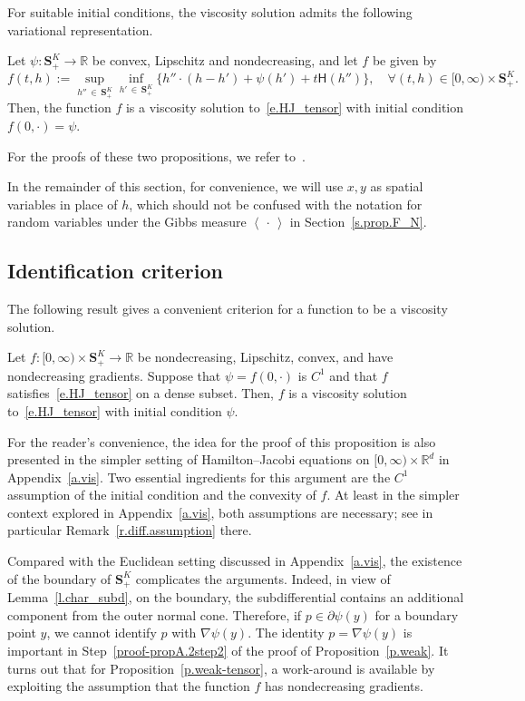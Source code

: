\documentclass[10pt]{amsart}
\theoremstyle{definition}\newtheorem{defi}[theo]{Definition}\newtheorem{rema}[theo]{Remark}\newtheorem{exam}[theo]{Example}\newtheorem{exem}[theo]{Example}\newtheorem{nota}[theo]{Notation}
\newcommand{\R}{\mathbb{R}}
\renewcommand{\S}{\mathbf{S}}
\renewcommand{\H}{\mathsf{H}}
\newcommand{\la}{\left\langle}
\newcommand{\ra}{\right\rangle}
\let\oldforall\forall
\renewcommand*{\forall}{\mathrel{\oldforall}}
\begin{document}
For suitable initial conditions, the viscosity solution admits the following variational representation.
\begin{prop}\label{p.hopf}
Let $\psi:\S^K_+\rightarrow \R$ be convex, Lipschitz and nondecreasing, and let $f$ be given by
\[
f(t,h) := \sup_{h''\,\in\,\S^K_+}\inf_{h'\,\in\,\S^K_+}\big\{h''\cdot \left(h-h'\right)+\psi\left(h'\right)+t\H\left(h''\right)\big\},\quad \forall (t,h)\in[0,\infty)\times \S^K_+.
\]
Then, the function $f$ is a viscosity solution to~\eqref{e.HJ_tensor} with initial condition $f(0,\cdot)=\psi$.
\end{prop}


For the proofs of these two propositions, we refer to~\cite[Section~6]{HBJ}.


In the {remainder} of this section, for convenience, we will use $x,y$ as spatial variables in place of $h$, which should not be confused with the notation for random variables under the Gibbs measure $\la\,\cdot\,\ra$ in Section~\ref{s.prop.F_N}.



\subsection{Identification criterion}\label{s.suff_cond}

The following result gives a convenient criterion for a function to be a viscosity solution.

\begin{prop}\label{p.weak-tensor}
Let $f : [0,\infty) \times \S^K_+ \to \R$ be nondecreasing, Lipschitz, convex, and have nondecreasing gradients. Suppose that $\psi = f(0,\cdot)$ is $C^1$ and that $f$ satisfies~\eqref{e.HJ_tensor} on a dense subset. Then, $f$ is a viscosity solution to~\eqref{e.HJ_tensor} with initial condition $\psi$.
\end{prop}



For the reader's convenience, the idea for the proof of this proposition is also presented in the simpler setting of Hamilton--Jacobi equations on $[0,\infty)\times \R^d$ in Appendix~\ref{a.vis}. Two essential ingredients for this argument are the $C^1$ assumption of the initial condition and the convexity of $f$. At least in the simpler context explored in Appendix~\ref{a.vis}, both assumptions are necessary; see in particular Remark~\ref{r.diff.assumption} there.



Compared with the Euclidean setting discussed in Appendix~\ref{a.vis}, the existence of the boundary of $\S^K_+$ complicates the arguments. Indeed, in view of Lemma~\ref{l.char_subd}, on the boundary, the subdifferential contains an additional component from the outer normal cone. Therefore, if $p\in\partial \psi(y)$ for a boundary point $y$, we cannot identify $p$ with $\nabla \psi(y)$. The identity $p=\nabla \psi (y)$ is important in Step~\ref{proof-propA.2step2} of the proof of Proposition~\ref{p.weak}. It turns out that for Proposition~\ref{p.weak-tensor}, a work-around is available by exploiting the assumption that the function $f$ has nondecreasing gradients.
\end{document}
